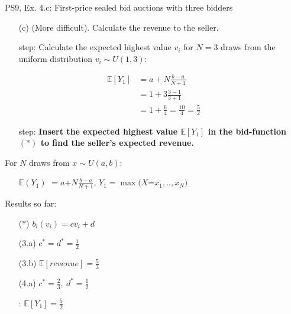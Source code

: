 \begin{frame}{PS9, Ex. 4.c: First-price sealed bid auctions with three bidders}
    \begin{itemize}
      \item[(c)] (More difficult). Calculate the revenue to the seller.
    \end{itemize}
    \vspace{-8pt}
    \begin{multicols}{2}
      \begin{itemize}
        \item[\nth{1} step:] Calculate the expected highest value $v_i$ for $N=3$ draws from the uniform distribution $v_i\sim U(1,3)$:
      \end{itemize}
      \vspace{-8pt}
      \begin{align*}
        \mathbb{E}[Y_1]&=a+N\frac{b-a}{N+1}\\
                       &=1+3\frac{3-1}{3+1}\\
                       &=1+\frac{6}{4}=\frac{10}{4}=\frac{5}{2}
      \end{align*}
      \vspace{-12pt}
      \begin{itemize}
        \item[\nth{2} step:] \textbf{Insert the expected highest value $\mathbb{E}[Y_1]$ in the bid-function $(*)$  to find the seller's expected revenue.}
      \end{itemize}
      \vfill\null\columnbreak
      For $N$ draws from $x\sim U(a, b):$
      \vspace{-6pt}
      \begin{enumerate}
        \item[$\mathbb{E}(Y_1)$] $=a$+$N\frac{b-a}{N+1}$, $Y_1=\max(X$=$x_1,..,x_N)$
      \end{enumerate}
      \vspace{-6pt}
      Results so far:
      \vspace{-6pt}
      \begin{itemize}
        \item[($*$)] $b_i(v_i) = cv_i+d$
        \item[(3.a)] $c^*=d^*=\frac{1}{2}$
        \item[(3.b)] $\mathbb{E}[revenue]=\frac{5}{3}$
        \item[(4.a)] $c^*=\frac{2}{3},\ d^*=\frac{1}{2}$
        \item[\nth{1}:] $\mathbb{E}[Y_1]=\frac{5}{2}$
      \end{itemize}
      \vfill\null
    \end{multicols}
    \vfill\null
\end{frame}

